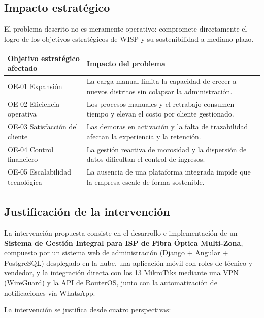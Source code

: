 \subsection{Impacto estratégico}

El problema descrito no es meramente operativo: compromete directamente el logro de
los objetivos estratégicos de WISP y su sostenibilidad a mediano plazo.

\begin{center}
\label{tab:impacto}
\begin{tabularx}{\textwidth}{L{3.6cm} X}
\toprule
\textbf{Objetivo estratégico afectado} & \textbf{Impacto del problema} \\
\midrule
OE-01 Expansión &
La carga manual limita la capacidad de crecer a nuevos distritos sin colapsar la
administración. \\
OE-02 Eficiencia operativa &
Los procesos manuales y el retrabajo consumen tiempo y elevan el costo por cliente
gestionado. \\
OE-03 Satisfacción del cliente &
Las demoras en activación y la falta de trazabilidad afectan la experiencia y la
retención. \\
OE-04 Control financiero &
La gestión reactiva de morosidad y la dispersión de datos dificultan el control de
ingresos. \\
OE-05 Escalabilidad tecnológica &
La ausencia de una plataforma integrada impide que la empresa escale de forma
sostenible. \\
\bottomrule
\end{tabularx}
\end{center}

\subsection{Justificación de la intervención}

La intervención propuesta consiste en el desarrollo e implementación de un
\textbf{Sistema de Gestión Integral para ISP de Fibra Óptica Multi-Zona}, compuesto
por un sistema web de administración (Django $+$ Angular $+$ PostgreSQL) desplegado en
la nube, una aplicación móvil con roles de técnico y vendedor, y la integración
directa con los 13 MikroTiks mediante una VPN (WireGuard) y la API de RouterOS, junto
con la automatización de notificaciones vía WhatsApp.

La intervención se justifica desde cuatro perspectivas:

